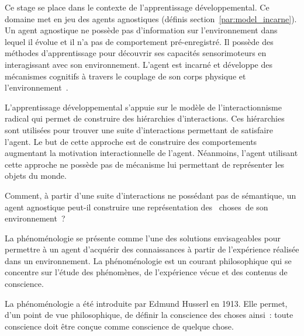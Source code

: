 \documentclass{llncs}
\begin{document}
Ce stage se place dans le contexte de l'apprentissage développemental. Ce domaine met en jeu des agents agnostiques (définis section~\ref{par:model_incarne}). Un agent agnostique ne possède pas d'information sur l'environnement dans lequel il évolue et il n'a pas de comportement pré-enregistré. Il possède des méthodes d'apprentissage pour découvrir ses capacités sensorimoteurs en interagissant avec son environnement. L'agent est incarné et développe des mécanismes cognitifs à travers le couplage de son corps physique et l'environnement~\cite{embodied-anderson2003embodied,embodied-brooks1991intelligence}. 

L'apprentissage développemental s'appuie sur le modèle de l'interactionnisme radical qui permet de construire des hiérarchies d'interactions.
Ces hiérarchies sont utilisées pour trouver une suite d'interactions permettant de satisfaire l'agent. Le but de cette approche est de construire des comportements augmentant la motivation interactionnelle de l'agent\cite{Liris-5870-interactional-motivation}. 
Néanmoins, l'agent utilisant cette approche ne possède pas de mécanisme lui permettant de représenter les objets du monde.

Comment, à partir d'une suite d'interactions ne possédant pas de sémantique, un agent agnostique peut-il construire une représentation des \og~choses~\fg de son environnement~?

La phénoménologie se présente comme l'une des solutions envisageables pour permettre à un agent d'acquérir des connaissances à partir de l'expérience réalisée dans un environnement. La phénoménologie est un courant philosophique qui se concentre sur l'étude des phénomènes, de l'expérience vécue et des contenus de conscience.

La phénoménologie a été introduite par Edmund Husserl en 1913. Elle permet, d'un point de vue philosophique, de définir la conscience des choses ainsi~: toute conscience doit être conçue comme conscience de quelque chose. 
\end{document}
